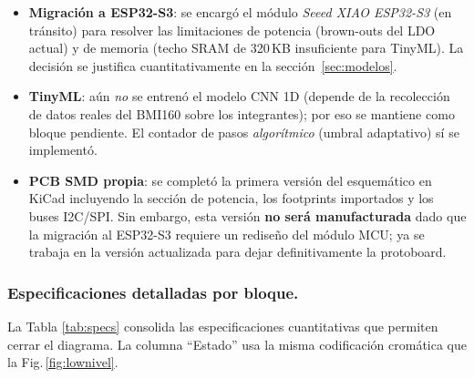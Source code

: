 \documentclass[letterpaper,11pt]{article}
\newcommand{\rfigura}[1]{Fig.\,\ref{#1}}
\newcommand{\rtabla}[1]{Tabla \ref{#1}}
\begin{document}
\begin{itemize}
    reglas de Firestore se concentrarán en el hito 60\,\%, en paralelo con la primera versión
    del \textit{gateway} móvil en Flutter.
    \item \textbf{Migración a ESP32-S3}: se encargó el módulo \textit{Seeed XIAO ESP32-S3}
    (en tránsito) para resolver las limitaciones de potencia (brown-outs del LDO actual) y de
    memoria (techo SRAM de 320\,KB insuficiente para TinyML). La decisión se justifica
    cuantitativamente en la sección~\ref{sec:modelos}.
    \item \textbf{TinyML}: aún \textit{no} se entrenó el modelo CNN 1D (depende de la
    recolección de datos reales del BMI160 sobre los integrantes); por eso se mantiene como bloque
    pendiente. El contador de pasos \textit{algorítmico} (umbral adaptativo) sí se implementó.
    \item \textbf{PCB SMD propia}: se completó la primera versión del esquemático en KiCad incluyendo la sección de potencia, los footprints
    importados y los buses I2C/SPI. Sin embargo, esta versión \textbf{no será manufacturada}
    dado que la migración al ESP32-S3 requiere un rediseño del módulo MCU; ya se trabaja
    en la versión actualizada para dejar definitivamente la protoboard.
\end{itemize}

\subsubsection{Especificaciones detalladas por bloque.} La \rtabla{tab:specs} consolida las
especificaciones cuantitativas que permiten cerrar el diagrama. La columna ``Estado'' usa
la misma codificación cromática que la \rfigura{fig:lownivel}.
\end{document}
